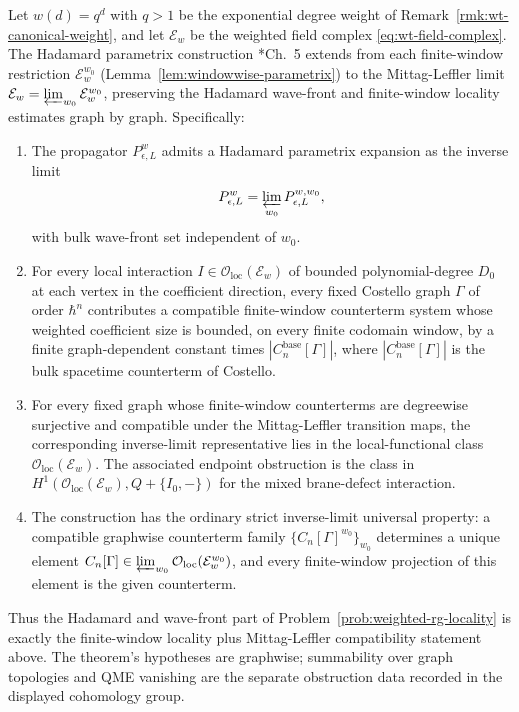 \begin{thm}\label{thm:hadamard-mittag-leffler}
  Let $w(d)=q^d$ with $q>1$ be the exponential degree weight of
  Remark~\ref{rmk:wt-canonical-weight}, and let $\mathcal E_w$ be the
  weighted field complex \eqref{eq:wt-field-complex}. The Hadamard
  parametrix construction
  \cite{costello-renormalization}*{Ch.~5} extends from each
  finite-window restriction $\mathcal E_w^{w_0}$
  (Lemma~\ref{lem:windowwise-parametrix}) to the Mittag-Leffler
  limit $\mathcal E_w=\varprojlim_{w_0}\mathcal E_w^{w_0}$,
  preserving the Hadamard wave-front and finite-window locality
  estimates graph by graph. Specifically:
  \begin{enumerate}[label=(\roman*)]
    \item The propagator $P_{\epsilon,L}^{w}$ admits a Hadamard
      parametrix expansion as the inverse limit
      \[
        P_{\epsilon,L}^{w}
          =\varprojlim_{w_0}P_{\epsilon,L}^{w,w_0},
      \]
      with bulk wave-front set independent of $w_0$.
    \item For every local interaction
      $I\in\mathcal O_{\mathrm{loc}}(\mathcal E_w)$ of bounded
      polynomial-degree $D_0$ at each vertex in the coefficient
      direction, every fixed Costello graph $\Gamma$ of order
      $\hbar^n$ contributes a compatible finite-window counterterm
      system whose weighted coefficient size is bounded, on every
      finite codomain window, by a finite graph-dependent constant times
      $|C_n^{\mathrm{base}}[\Gamma]|$, where
      $|C_n^{\mathrm{base}}[\Gamma]|$ is the bulk spacetime
      counterterm of Costello.
    \item For every fixed graph whose finite-window counterterms are
      degreewise surjective and compatible under the Mittag-Leffler
      transition maps, the corresponding inverse-limit representative
      lies in the local-functional class
      \(\mathcal O_{\mathrm{loc}}(\mathcal E_w)\). The associated
      endpoint obstruction is the class in
      $H^1(\mathcal O_{\mathrm{loc}}(\mathcal E_w),Q+\{I_0,-\})$
      for the mixed brane-defect interaction.
    \item The construction has the ordinary strict inverse-limit
      universal property: a compatible graphwise
      counterterm family
      \(\{C_n[\Gamma]^{w_0}\}_{w_0}\) determines a unique element
      \(C_n[\Gamma]\in
      \varprojlim_{w_0}\mathcal O_{\mathrm{loc}}(\mathcal E_w^{w_0})\),
      and every finite-window projection of this element is the given
      counterterm.
  \end{enumerate}
  Thus the Hadamard and wave-front part of
  Problem~\ref{prob:weighted-rg-locality} is exactly the
  finite-window locality plus Mittag-Leffler compatibility statement
  above.  The theorem's hypotheses are graphwise; summability over graph
  topologies and QME vanishing are the separate obstruction data recorded
  in the displayed cohomology group.
\end{thm}

